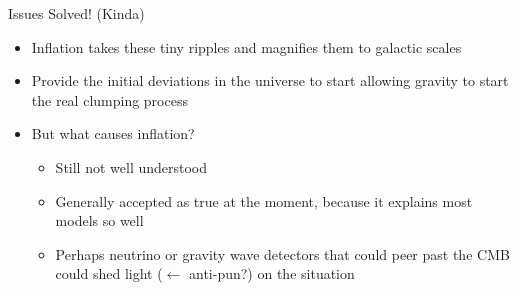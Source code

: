 \documentclass[pdf,aspectratio=169]{beamer}
\begin{document}
\begin{frame}{Issues Solved! (Kinda)}
  \begin{itemize}
	\item Inflation takes these tiny ripples and magnifies them to galactic scales
	\item Provide the initial deviations in the universe to start allowing gravity to start the real clumping process
	\item But what causes inflation?
	  \begin{itemize}
		\item Still not well understood
		\item Generally accepted as true at the moment, because it explains most models so well
		\item Perhaps neutrino or gravity wave detectors that could peer past the CMB could shed light ($\leftarrow$ anti-pun?) on the situation
	  \end{itemize}
  \end{itemize}
\end{frame}
\end{document}
